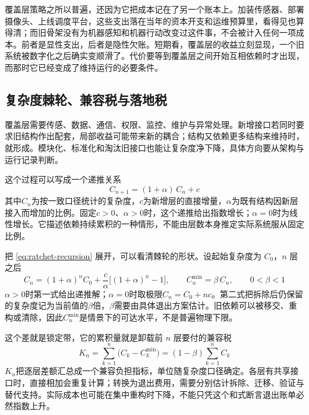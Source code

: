 覆盖层策略之所以普遍，还因为它把成本记在了另一个账本上。加装传感器、部署摄像头、上线调度平台，这些支出落在当年的资本开支和运维预算里，看得见也算得清；而旧骨架没有为机器感知和机器行动改变过这件事，不会被计入任何一项成本。前者是显性支出，后者是隐性欠账。短期看，覆盖层的收益立刻显现，一个旧系统被数字化之后确实变顺滑了。代价要等到覆盖层之间开始互相依赖时才出现，而那时它已经变成了维持运行的必要条件。

\subsection{复杂度棘轮、兼容税与落地税}


覆盖层需要传感、数据、通信、权限、监控、维护与异常处理。新增接口若同时要求旧结构作出配套，局部收益可能带来新的耦合；结构又依赖更多结构来维持时，就形成。模块化、标准化和淘汰旧接口也能让复杂度净下降，具体方向要从架构与运行记录判断。

这个过程可以写成一个递推关系
\begin{equation}
C_{n+1}=(1+\alpha)\,C_n+c
\label{eq:ratchet-recursion}
\end{equation}
其中$C_n$为按一致口径统计的复杂度，$c$为新增层的直接增量，$\alpha$为既有结构因新层接入而增加的比例。固定$c>0$、$\alpha>0$时，这个递推给出指数增长；$\alpha=0$时为线性增长。它描述依赖持续累积的一种情形，不能由层数本身推定实际系统服从固定比例。

把 \eqref{eq:ratchet-recursion} 展开，可以看清棘轮的形状。设起始复杂度为 $C_{0}$，$n$ 层之后
\begin{equation}
C_{n}=(1+\alpha)^{n}C_{0}+\frac{c}{\alpha}\bigl[(1+\alpha)^{n}-1\bigr],
\qquad
C^{\min}_{n}=\beta\,C_{n},\qquad 0<\beta<1
\label{eq:ratchet-floor}
\end{equation}
$\alpha>0$时第一式给出递推解；$\alpha=0$时取极限$C_n=C_0+nc$。第二式把拆除后仍保留的复杂度记为当前值的$\beta$倍，$\beta$需要由具体退出方案估计。旧依赖可以被移交、重构或清除，因此$C_n^{\min}$是情景下的可达水平，不是普遍物理下限。

这个差就是锁定带，它的累积量就是卸载前 $n$ 层要付的兼容税
\begin{equation}
K_{n}=\sum_{k=1}^{n}\bigl(C_{k}-C^{\min}_{k}\bigr)=(1-\beta)\sum_{k=1}^{n}C_{k}
\label{eq:compat-tax}
\end{equation}
$K_n$把逐层差额汇总成一个兼容负担指标，单位随复杂度口径确定。各层有共享接口时，直接相加会重复计算；转换为退出费用，需要分别估计拆除、迁移、验证与替代支持。实际成本也可能在集中重构时下降，不能只凭这个和式断言退出账单必然指数上升。

